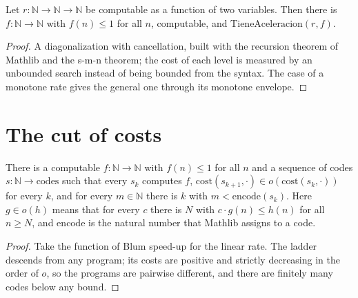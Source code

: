 \begin{theorem}
  \label{thm:information-blum-exists}
  \leanok
  Let $r : \mathbb{N} \to \mathbb{N} \to \mathbb{N}$ be computable as a function of two variables.
  Then there is $f : \mathbb{N} \to \mathbb{N}$ with $f(n) \le 1$ for all $n$, computable, and
  $\mathrm{TieneAceleracion}(r, f)$.
\end{theorem}

\begin{proof}
  \leanok
  A diagonalization with cancellation, built with the recursion theorem of Mathlib and the
  s-m-n theorem; the cost of each level is measured by an unbounded search instead of being bounded
  from the syntax. The case of a monotone rate gives the general one through its monotone envelope.
\end{proof}

\section{The cut of costs}
\label{sec:information-cut}

\begin{theorem}
  \label{thm:information-irrational-cut}
  \leanok
  There is a computable $f : \mathbb{N} \to \mathbb{N}$ with $f(n) \le 1$ for all $n$ and a sequence
  of codes $s : \mathbb{N} \to \text{codes}$ such that every $s_k$ computes $f$,
  $\mathrm{cost}(s_{k+1}, \cdot) \in o(\mathrm{cost}(s_k, \cdot))$ for every $k$, and for every $m
  \in \mathbb{N}$ there is $k$ with $m < \mathrm{encode}(s_k)$. Here $g \in o(h)$ means that for
  every $c$ there is $N$ with $c \cdot g(n) \le h(n)$ for all $n \ge N$, and $\mathrm{encode}$ is the
  natural number that Mathlib assigns to a code.
  \own{}
\end{theorem}

\begin{proof}
  \leanok
  Take the function of Blum speed-up for the linear rate. The ladder descends from any program; its
  costs are positive and strictly decreasing in the order of $o$, so the programs are pairwise
  different, and there are finitely many codes below any bound.
\end{proof}

